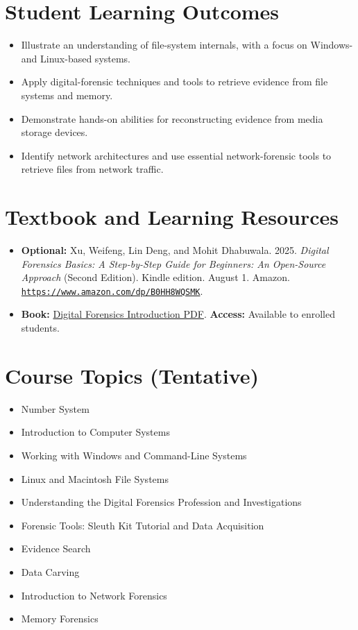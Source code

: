 \documentclass[10pt]{article}
\begin{document}
\section{Student Learning Outcomes}
\begin{itemize}
  \item Illustrate an understanding of file-system internals, with a focus on Windows- and Linux-based systems.
  \item Apply digital-forensic techniques and tools to retrieve evidence from file systems and memory.
  \item Demonstrate hands-on abilities for reconstructing evidence from media storage devices.
  \item Identify network architectures and use essential network-forensic tools to retrieve files from network traffic.
\end{itemize}

\section{Textbook and Learning Resources}
\begin{itemize}
  \item \textbf{Optional:} Xu, Weifeng, Lin Deng, and Mohit Dhabuwala. 2025. \emph{Digital Forensics Basics: A Step-by-Step Guide for Beginners: An Open-Source Approach} (Second Edition). Kindle edition. August 1. Amazon. \href{https://www.amazon.com/dp/B0HH8WQSMK}{\nolinkurl{https://www.amazon.com/dp/B0HH8WQSMK}}.
  \item \textbf{Book:} \href{https://github.com/frankwxu/public_space/blob/main/teaching/CYFI725/cyfi725_book.pdf}{Digital Forensics Introduction PDF}. \textbf{Access:} Available to enrolled students.
\end{itemize}

\section{Course Topics (Tentative)}
\begin{itemize}
  \item Number System
  \item Introduction to Computer Systems
  \item Working with Windows and Command-Line Systems
  \item Linux and Macintosh File Systems
  \item Understanding the Digital Forensics Profession and Investigations
  \item Forensic Tools: Sleuth Kit Tutorial and Data Acquisition
  \item Evidence Search
  \item Data Carving
  \item Introduction to Network Forensics
  \item Memory Forensics
\end{itemize}
\end{document}
